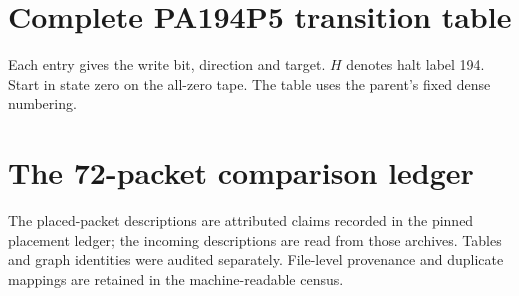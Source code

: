 \documentclass[11pt,letterpaper]{article}
\begin{document}
\appendix
\clearpage
\section{Complete PA194P5 transition table}
\label{app:table}
Each entry gives the write bit, direction and target. $H$ denotes
halt label 194. Start in state zero on the all-zero tape.
The table uses the parent's fixed dense numbering.


\clearpage
\section{The 72-packet comparison ledger}
\label{app:ledger}
The placed-packet descriptions are attributed claims recorded
in the pinned placement ledger; the incoming descriptions are
read from those archives. Tables and graph identities were
audited separately. File-level provenance and duplicate mappings
are retained in the machine-readable census.
{\small}
\end{document}
